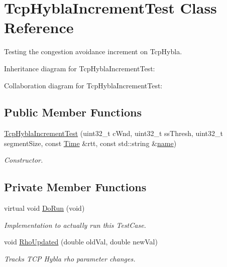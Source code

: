 \hypertarget{classTcpHyblaIncrementTest}{}\section{Tcp\+Hybla\+Increment\+Test Class Reference}
\label{classTcpHyblaIncrementTest}


Testing the congestion avoidance increment on Tcp\+Hybla.  




Inheritance diagram for Tcp\+Hybla\+Increment\+Test\+:


Collaboration diagram for Tcp\+Hybla\+Increment\+Test\+:
\subsection*{Public Member Functions}
\begin{DoxyCompactItemize}
\item 
\hyperlink{classTcpHyblaIncrementTest_afe6c6919b5d71ebe8e6874160c9b1935}{Tcp\+Hybla\+Increment\+Test} (uint32\+\_\+t c\+Wnd, uint32\+\_\+t ss\+Thresh, uint32\+\_\+t segment\+Size, const \hyperlink{classns3_1_1Time}{Time} \&rtt, const std\+::string \&\hyperlink{generate__test__data__lte__spectrum__model_8m_ab74e6bf80237ddc4109968cedc58c151}{name})
\begin{DoxyCompactList}\small\item\em Constructor. \end{DoxyCompactList}\end{DoxyCompactItemize}
\subsection*{Private Member Functions}
\begin{DoxyCompactItemize}
\item 
virtual void \hyperlink{classTcpHyblaIncrementTest_a22a9600b99784b480e1b615803cf9b1c}{Do\+Run} (void)
\begin{DoxyCompactList}\small\item\em Implementation to actually run this Test\+Case. \end{DoxyCompactList}\item 
void \hyperlink{classTcpHyblaIncrementTest_ad08c0effc0241bc35273e3168b2cf4f9}{Rho\+Updated} (double old\+Val, double new\+Val)
\begin{DoxyCompactList}\small\item\em Tracks T\+CP Hybla rho parameter changes. \end{DoxyCompactList}\end{DoxyCompactItemize}
